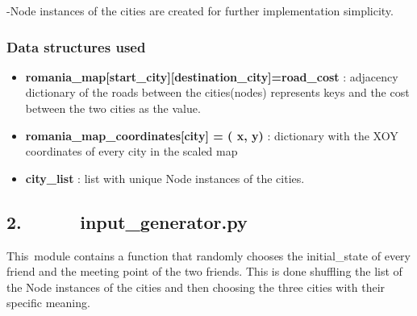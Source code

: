 \documentclass[12pt]{article}
\begin{document}
\begin{adjustwidth}{0.5in}{0.0in}
\begin{justify}
-Node instances of the cities are created for further implementation simplicity.
\end{justify}\par

\end{adjustwidth}

\subsubsection*{\hspace*{10pt}Data structures used}
\begin{itemize}
	\item \textbf{romania\_map[start\_city][destination\_city]=road\_cost }: adjacency dictionary of the roads between the cities(nodes) represents keys and the cost between the two cities as the value.\par

	\item \textbf{romania\_map\_coordinates[city] = ( x, y) }: dictionary with the XOY coordinates of every city in the scaled map\par

	\item \textbf{city\_list }: list with unique Node instances of the cities.
\end{itemize}\par


\vspace{\baselineskip}

\vspace{\baselineskip}
\subsection*{2.\ \ \ \ \ \  input\_generator.py}
\begin{adjustwidth}{0.5in}{0.0in}
\begin{justify}
This\ module contains a function that randomly chooses the initial\_state of every friend and the meeting point of the two friends. This is done shuffling the list of the Node instances of the cities  and then choosing the three cities with their specific meaning.
\end{justify}\par

\end{adjustwidth}
\end{document}
